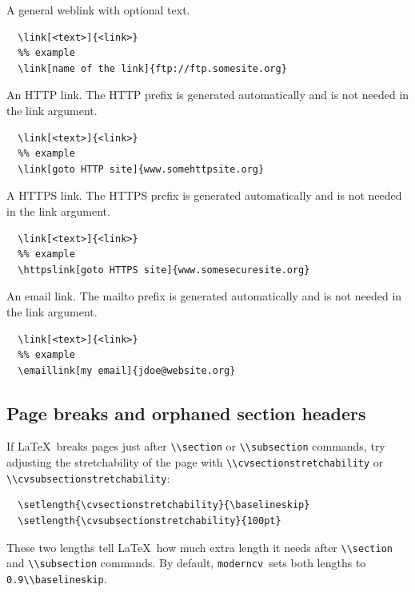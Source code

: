 \documentclass[a4paper, 11pt]{article}
\newcommand{\code}[1]{\lstinline!#1!}
\newcommand{\moderncv}{\code{moderncv}}
\newcommand{\Moderncv}{\moderncv~}
\newcommand{\Latex}{\LaTeX~}
\begin{document}
A general weblink with optional text.  
\begin{lstlisting}
  \link[<text>]{<link>}
  %% example
  \link[name of the link]{ftp://ftp.somesite.org}
\end{lstlisting}

An HTTP link. The HTTP prefix is generated automatically and is not needed in the link argument.
\begin{lstlisting}
  \link[<text>]{<link>}
  %% example
  \link[goto HTTP site]{www.somehttpsite.org}
\end{lstlisting}

A HTTPS link. The HTTPS prefix is generated automatically and is not needed in the link argument.
\begin{lstlisting}
  \link[<text>]{<link>}
  %% example
  \httpslink[goto HTTPS site]{www.somesecuresite.org}
\end{lstlisting}

An email link. The mailto prefix is generated automatically and is not needed in the link argument.
\begin{lstlisting}
  \link[<text>]{<link>}
  %% example
  \emaillink[my email]{jdoe@website.org}
\end{lstlisting}

\subsection{Page breaks and orphaned section headers}
If \Latex breaks pages just after \code{\\section} or \code{\\subsection} commands, try adjusting the stretchability of the page with \code{\\cvsectionstretchability} or \code{\\cvsubsectionstretchability}:
\begin{lstlisting}
  \setlength{\cvsectionstretchability}{\baselineskip}
  \setlength{\cvsubsectionstretchability}{100pt}
\end{lstlisting}
These two lengths tell \Latex how much extra length it needs after \code{\\section} and \code{\\subsection} commands.
By default, \Moderncv sets both lengths to \code{0.9\\baselineskip}.
\end{document}
